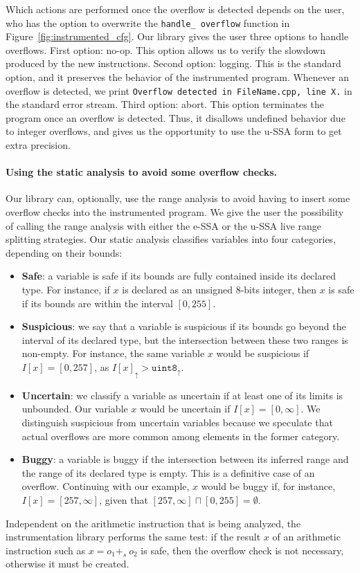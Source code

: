 \documentclass{sigplanconf}[10pt]
\newcommand{\ub}[1]{#1_{\uparrow}}
\begin{document}
Which actions are performed once the overflow is detected depends on the
user, who has the option to overwrite the \texttt{handle\_ overflow}
function in Figure~\ref{fig:instrumented_cfg}.
Our library gives the user three options to handle overflows. 
First option: no-op.
This option allows us to verify the slowdown produced by the new instructions.
Second option: logging.
This is the standard option, and it preserves the behavior of the instrumented
program.
Whenever an overflow is detected, we print \texttt{Overflow detected in
FileName.cpp, line X.} in the standard error stream.
Third option: abort.
This option terminates the program once an overflow is detected.
Thus, it disallows undefined behavior due to integer overflows, and gives us the
opportunity to use the u-SSA form to get extra precision.

\paragraph{Using the static analysis to avoid some overflow checks.}
Our library can, optionally, use the range analysis to avoid having to
insert some overflow checks into the instrumented program.
We give the user the possibility of calling the range analysis with either the
e-SSA or the u-SSA live range splitting strategies.
Our static analysis classifies variables into four categories, depending on
their bounds:
\begin{itemize}
\item \textbf{Safe}: a variable is safe if its bounds are fully contained
inside its declared type.
For instance, if $x$ is declared as an unsigned 8-bits integer, then $x$ is
safe if its bounds are within the interval $[0, 255]$.
\item \textbf{Suspicious}: we say that a variable is suspicious if its bounds
go beyond the interval of its declared type, but the intersection between
these two ranges is non-empty.
For instance, the same variable $x$ would be suspicious if
$I[x] = [0, 257]$, as $\ub{I[x]} > \ub{\mathtt{uint8}}$.
\item \textbf{Uncertain}: we classify a variable as uncertain if at least one
of its limits is unbounded.
Our variable $x$ would be uncertain if $I[x] = [0, \infty]$.
We distinguish suspicious from uncertain variables because we speculate that
actual overflows are more common among elements in the former category.
\item \textbf{Buggy}: a variable is buggy if the intersection between its
inferred range and the range of its declared type is empty.
This is a definitive case of an overflow.
Continuing with our example, $x$ would be buggy if, for instance,
$I[x] = [257, \infty]$, given that $[257, \infty] \sqcap [0, 255] = \emptyset$.
\end{itemize}
Independent on the arithmetic instruction that is being analyzed, the
instrumentation library performs the same test:
if the result $x$ of an arithmetic instruction such as $x = o_1 +_s \ o_2$ is
safe, then the overflow check is not necessary, otherwise it must be
created.
\end{document}
